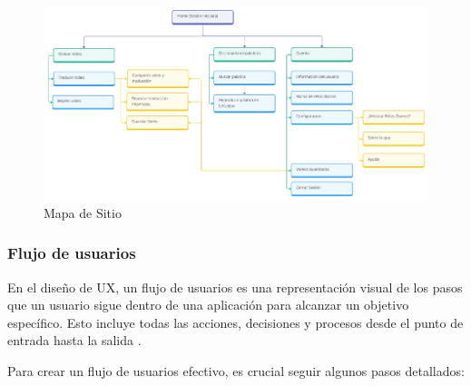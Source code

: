 \begin{figure} [H]
    \centering
    \includegraphics[width=1\linewidth]{figuras/mapa_sitio.png}
    \caption{Mapa de Sitio}
    \label{fig:enter-label}
\end{figure}


\subsubsection{Flujo de usuarios}

En el diseño de UX, un flujo de usuarios es una representación visual de los pasos que un usuario sigue dentro de una aplicación para alcanzar un objetivo específico. Esto incluye todas las acciones, decisiones y procesos desde el punto de entrada hasta la salida \cite{Adobe2022}.

Para crear un flujo de usuarios efectivo, es crucial seguir algunos pasos detallados:

